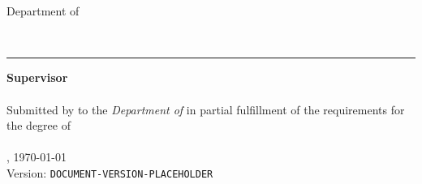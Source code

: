 \begin{titlepage}
    \begin{center}
        {\Large%
           \textsc{\university{}}%
        }
        \\\medskip
        {%
            \textbf{
                \universityFaculty{}
            }\\
            Department of \universityDepartment{}%
        }
        \\\vfill
        {\Huge%
            \textsc{%
                \documentTitle{}%
            }\par%
        }
        \medskip
        {\large%
            \textsl{%
                \documentSubtitle{}%
            }
        }
        \\\vfill
        {\Large%
            \textbf{\shortTitle{}}%
        }
    \end{center}
	\vfill
	\rule{\textwidth}{.4pt}
	\vfill
    \begin{flushleft}
        \textbf{Supervisor}\\
        \medskip
        \researchAdvisor{}\\
        \bigskip
        Submitted by \textbf{\documentAuthor{}} to the \textsl{Department of \universityDepartment{}} in partial fulfillment of the requirements for the degree of\\
        \textbf{\academicDegree{}}\\
        \medskip{}
        \documentPlace{}, \germanDate{}\today{}\\
        Version: \texttt{DOCUMENT-VERSION-PLACEHOLDER}\\
    \end{flushleft}
\end{titlepage}
